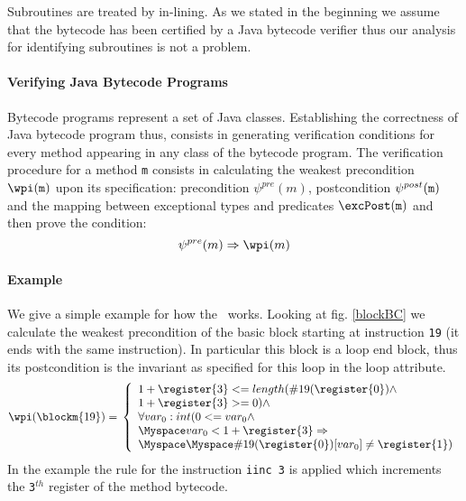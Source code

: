 Subroutines are treated by in-lining. As we stated in the beginning we assume that the bytecode has been certified by a Java
bytecode verifier thus our analysis for identifying  subroutines is not a problem.  


\paragraph{Verifying Java Bytecode Programs} Bytecode programs represent a set of Java classes. Establishing the correctness of Java bytecode program thus, consists in generating verification conditions for every method appearing in any class of the bytecode program.
The verification procedure for a method \texttt{m} consists in  calculating the weakest precondition $\wpi(\tt{m})$ upon its specification: precondition $\psi^{pre}(m)$, 
postcondition $\psi^{post}(\tt{m})$ and the mapping between exceptional types and predicates $\excPost(\tt{m})$ and then prove the condition: 
$$
\psi^{pre}(m)  \Rightarrow \wpi(m)
$$    

\paragraph{Example} We give a simple example for how the \wpi \ works. Looking at fig. \ref{blockBC} we calculate the weakest precondition of the basic block starting at instruction \texttt{19} (it ends with the same instruction). In particular this block is a loop end block, thus its postcondition is
the invariant as specified for this loop in the loop attribute.
$$
\wpi(\blockm{19}) = \\
\left\{ \begin{array}{l}    
1 + \register{3} <= length(\#19(\register{0}) \wedge \\
                      1 + \register{3} >= 0)  \wedge \\ 
                        \forall  var_0:int  (  0 <= var_0 \wedge \\
                    \Myspace    var_0 < 1 + \register{3}  \Rightarrow \\
                \Myspace \Myspace \#19( \register{0})[var_0] \neq \register{1} )
\end{array}
\right.
$$
In the example the rule for the instruction \texttt{iinc 3} is applied which increments the \texttt{3$^{th}$} register of the method bytecode. 

